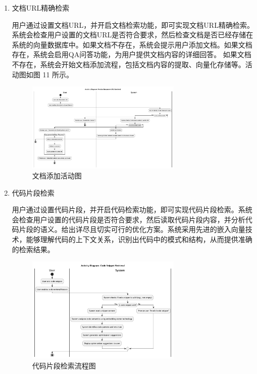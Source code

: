 \documentclass[
    report,     %
    oneside,    %
    UTF8,       %
    zihao=-4    %
]{config} %
\begin{document}
\begin{enumerate}[label=(\arabic*)]
    \item 文档URL精确检索
    
    用户通过设置文档URL，并开启文档检索功能，即可实现文档URL精确检索。系统会检查用户设置的文档URL是否符合要求，然后检查文档是否已经存储在系统的向量数据库中。如果文档不存在，系统会提示用户添加文档。如果文档存在，系统会启用QA问答功能，为用户提供文档内容的详细回答。
    如果文档不存在，系统会开始文档添加流程，包括文档内容的提取、向量化存储等。活动图如图 11 所示。
    \begin{figure}[H] %
        \centering %
        \includegraphics[width=0.7\textwidth]{UML/Activity/Precise-Document-URL-Retrieval.png}
        \caption{文档添加活动图} %
        \label{fig:DocumentAdditionActivityDiagram} %
    \end{figure}
    
    \item 代码片段检索
    
    用户通过设置代码片段，并开启代码检索功能，即可实现代码片段检索。系统会检查用户设置的代码片段是否符合要求，然后读取代码片段内容，并分析代码片段的语义。给出详尽且切实可行的优化方案。系统采用先进的嵌入向量技术，能够理解代码的上下文关系，识别出代码中的模式和结构，从而提供准确的检索结果。
    \begin{figure}[H]
        \centering
        \includegraphics[width=0.7\textwidth]{UML/Activity/Code-Snippet-Retrieval.png}
        \caption{代码片段检索流程图}
        \label{fig:CodeSnippetRetrievalFlow}
    \end{figure}


\end{enumerate}
\end{document}
